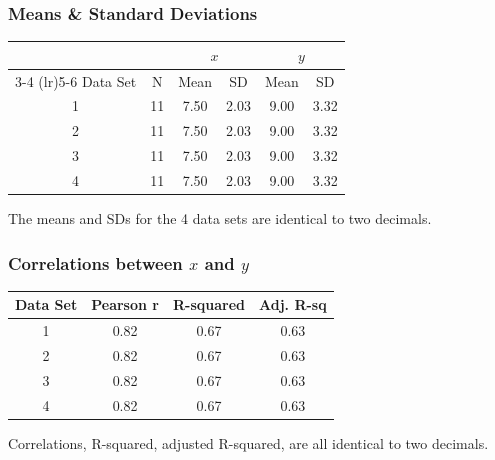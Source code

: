 \documentclass[10pt]{beamer} %
\begin{document}
\begin{frame}
    \frametitle{Means \& Standard Deviations}
    \begin{table}\scriptsize
        \centering
        \begin{tabular}{cccccc}
            \toprule
            & & \multicolumn{2}{c}{$x$} & \multicolumn{2}{c}{$y$} \\
            \cmidrule(lr){3-4} \cmidrule(lr){5-6}
            Data Set & N & Mean & SD & Mean & SD \\
            \midrule
            1 & 11 & 7.50 & 2.03 & 9.00 & 3.32 \\
            2 & 11 & 7.50 & 2.03 & 9.00 & 3.32 \\
            3 & 11 & 7.50 & 2.03 & 9.00 & 3.32 \\
            4 & 11 & 7.50 & 2.03 & 9.00 & 3.32 \\
            \bottomrule
        \end{tabular}
    \end{table}
    
    \vspace{0.5cm}
    \begin{center}
       The means and SDs for the 4 data sets are identical to two decimals.
    \end{center}
\end{frame}

\begin{frame}
    \frametitle{Correlations between $x$ and $y$}
    \begin{table}\scriptsize
        \centering
        \begin{tabular}{cccc}
            \toprule
            Data Set & Pearson r & R-squared & Adj. R-sq\\
            \midrule
            1 & 0.82 & 0.67 & 0.63 \\
            2 & 0.82 & 0.67 & 0.63 \\
            3 & 0.82 & 0.67 & 0.63 \\
            4 & 0.82 & 0.67 & 0.63 \\
            \bottomrule
        \end{tabular}
    \end{table}
    
    \vspace{0.5cm}
    \begin{center}
        Correlations, R-squared, adjusted R-squared, are all identical to two decimals.
    \end{center}
\end{frame}
\end{document}
